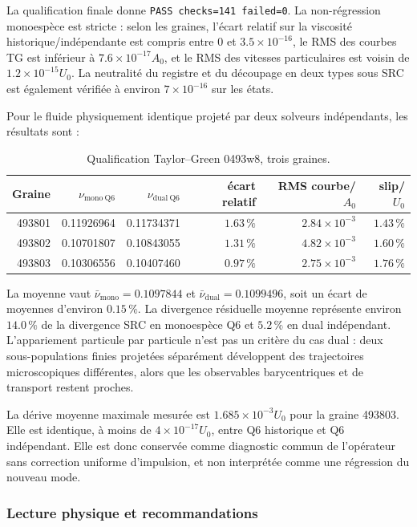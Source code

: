 \documentclass[11pt,a4paper]{article}
\begin{document}
La qualification finale donne \texttt{PASS checks=141 failed=0}. La non-régression monoespèce est stricte : selon les graines, l'écart relatif sur la viscosité historique/indépendante est compris entre $0$ et $3.5\times10^{-16}$, le RMS des courbes TG est inférieur à $7.6\times10^{-17}A_0$, et le RMS des vitesses particulaires est voisin de $1.2\times10^{-15}U_0$. La neutralité du registre et du découpage en deux types sous SRC est également vérifiée à environ $7\times10^{-16}$ sur les états.

Pour le fluide physiquement identique projeté par deux solveurs indépendants, les résultats sont :
\begin{table}[htbp]
\centering
\small
\caption{Qualification Taylor--Green 0493w8, trois graines.}
\begin{tabular}{@{}rrrrrr@{}}
\toprule
Graine & $\nu_{\mathrm{mono\ Q6}}$ & $\nu_{\mathrm{dual\ Q6}}$ & écart relatif & RMS courbe/$A_0$ & slip/$U_0$ \\
\midrule
493801 & 0.11926964 & 0.11734371 & $1.63\,\%$ & $2.84\times10^{-3}$ & $1.43\,\%$ \\
493802 & 0.10701807 & 0.10843055 & $1.31\,\%$ & $4.82\times10^{-3}$ & $1.60\,\%$ \\
493803 & 0.10306556 & 0.10407460 & $0.97\,\%$ & $2.75\times10^{-3}$ & $1.76\,\%$ \\
\bottomrule
\end{tabular}
\end{table}
La moyenne vaut $\bar\nu_{\mathrm{mono}}=0.1097844$ et $\bar\nu_{\mathrm{dual}}=0.1099496$, soit un écart de moyennes d'environ $0.15\,\%$. La divergence résiduelle moyenne représente environ $14.0\,\%$ de la divergence SRC en monoespèce Q6 et $5.2\,\%$ en dual indépendant. L'appariement particule par particule n'est pas un critère du cas dual : deux sous-populations finies projetées séparément développent des trajectoires microscopiques différentes, alors que les observables barycentriques et de transport restent proches.

La dérive moyenne maximale mesurée est $1.685\times10^{-3}U_0$ pour la graine 493803. Elle est identique, à moins de $4\times10^{-17}U_0$, entre Q6 historique et Q6 indépendant. Elle est donc conservée comme diagnostic commun de l'opérateur sans correction uniforme d'impulsion, et non interprétée comme une régression du nouveau mode.

\subsubsection{Lecture physique et recommandations}
\end{document}
